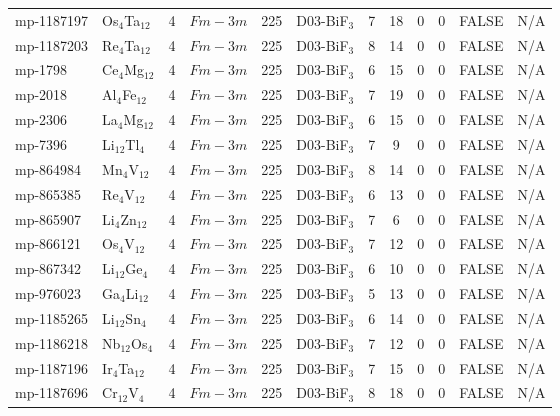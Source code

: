 {\begin{longtable}{llcccccccccc}
    mp-1187197 & Os$_{4}$Ta$_{12}$ & 4     & $Fm-3m$ & 225   & D03-BiF$_{3}$ & 7     & 18    & 0     & 0     & FALSE & N/A \\
    mp-1187203 & Re$_{4}$Ta$_{12}$ & 4     & $Fm-3m$ & 225   & D03-BiF$_{3}$ & 8     & 14    & 0     & 0     & FALSE & N/A \\
    mp-1798 & Ce$_{4}$Mg$_{12}$ & 4     & $Fm-3m$ & 225   & D03-BiF$_{3}$ & 6     & 15    & 0     & 0     & FALSE & N/A \\
    mp-2018 & Al$_{4}$Fe$_{12}$ & 4     & $Fm-3m$ & 225   & D03-BiF$_{3}$ & 7     & 19    & 0     & 0     & FALSE & N/A \\
    mp-2306 & La$_{4}$Mg$_{12}$ & 4     & $Fm-3m$ & 225   & D03-BiF$_{3}$ & 6     & 15    & 0     & 0     & FALSE & N/A \\
    mp-7396 & Li$_{12}$Tl$_{4}$ & 4     & $Fm-3m$ & 225   & D03-BiF$_{3}$ & 7     & 9     & 0     & 0     & FALSE & N/A \\
    mp-864984 & Mn$_{4}$V$_{12}$ & 4     & $Fm-3m$ & 225   & D03-BiF$_{3}$ & 8     & 14    & 0     & 0     & FALSE & N/A \\
    mp-865385 & Re$_{4}$V$_{12}$ & 4     & $Fm-3m$ & 225   & D03-BiF$_{3}$ & 6     & 13    & 0     & 0     & FALSE & N/A \\
    mp-865907 & Li$_{4}$Zn$_{12}$ & 4     & $Fm-3m$ & 225   & D03-BiF$_{3}$ & 7     & 6     & 0     & 0     & FALSE & N/A \\
    mp-866121 & Os$_{4}$V$_{12}$ & 4     & $Fm-3m$ & 225   & D03-BiF$_{3}$ & 7     & 12    & 0     & 0     & FALSE & N/A \\
    mp-867342 & Li$_{12}$Ge$_{4}$ & 4     & $Fm-3m$ & 225   & D03-BiF$_{3}$ & 6     & 10    & 0     & 0     & FALSE & N/A \\
    mp-976023 & Ga$_{4}$Li$_{12}$ & 4     & $Fm-3m$ & 225   & D03-BiF$_{3}$ & 5     & 13    & 0     & 0     & FALSE & N/A \\
    mp-1185265 & Li$_{12}$Sn$_{4}$ & 4     & $Fm-3m$ & 225   & D03-BiF$_{3}$ & 6     & 14    & 0     & 0     & FALSE & N/A \\
    mp-1186218 & Nb$_{12}$Os$_{4}$ & 4     & $Fm-3m$ & 225   & D03-BiF$_{3}$ & 7     & 12    & 0     & 0     & FALSE & N/A \\
    mp-1187196 & Ir$_{4}$Ta$_{12}$ & 4     & $Fm-3m$ & 225   & D03-BiF$_{3}$ & 7     & 15    & 0     & 0     & FALSE & N/A \\
    mp-1187696 & Cr$_{12}$V$_{4}$ & 4     & $Fm-3m$ & 225   & D03-BiF$_{3}$ & 8     & 18    & 0     & 0     & FALSE & N/A \\

\end{longtable}}
